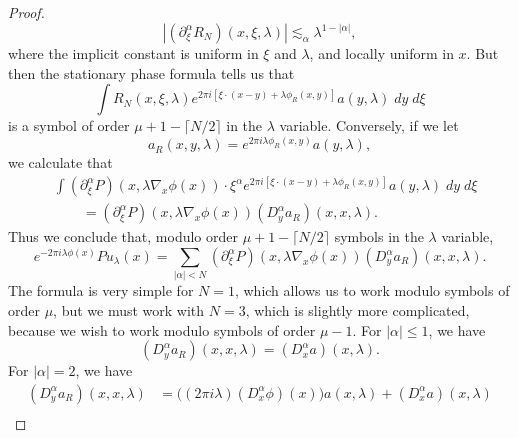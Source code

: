 \documentclass{article}
\theoremstyle{plain}
\theoremstyle{remark}
\theoremstyle{definition}
\begin{document}
\begin{proof}
	\[ |(\partial_\xi^\alpha R_N)(x,\xi,\lambda)| \lesssim_\alpha \lambda^{1 - |\alpha|}, \]
	where the implicit constant is uniform in $\xi$ and $\lambda$, and locally uniform in $x$.
	But then the stationary phase formula tells us that
	\[ \int R_N(x,\xi,\lambda) e^{2 \pi i [ \xi \cdot (x - y) + \lambda \phi_R(x,y) ]} a(y,\lambda)\; dy\; d\xi \]
	is a symbol of order $\mu + 1 - \lceil N/2 \rceil$ in the $\lambda$ variable. Conversely, if we let
	\[ a_R(x,y,\lambda) = e^{2 \pi i \lambda \phi_R(x,y)} a(y,\lambda), \]
	we calculate that
	\begin{align*}
		&\int (\partial_\xi^\alpha P)(x, \lambda \nabla_x \phi(x)) \cdot \xi^\alpha e^{2 \pi i [\xi \cdot (x - y) + \lambda \phi_R(x,y)]} a(y,\lambda)\; dy\; d\xi\\
		&\quad\quad = (\partial_\xi^\alpha P)(x, \lambda \nabla_x \phi(x)) (D_y^\alpha a_R)(x,x,\lambda).
	\end{align*}
	Thus we conclude that, modulo order $\mu + 1 - \lceil N/2 \rceil$ symbols in the $\lambda$ variable,
	\[ e^{-2 \pi i \lambda \phi(x)} Pu_\lambda(x) = \sum_{|\alpha| < N} (\partial_\xi^\alpha P)(x, \lambda \nabla_x \phi(x)) (D^\alpha_y a_R)(x,x,\lambda). \]
	The formula is very simple for $N = 1$, which allows us to work modulo symbols of order $\mu$, but we must work with $N = 3$, which is slightly more complicated, because we wish to work modulo symbols of order $\mu - 1$. For $|\alpha| \leq 1$, we have
	\[ (D^\alpha_y a_R)(x,x,\lambda) = (D^\alpha_x a)(x,\lambda). \]
	For $|\alpha| = 2$, we have
	\begin{align*}
		(D^\alpha_y a_R)(x,x,\lambda) &= \Big( (2 \pi i \lambda) (D^\alpha_x \phi)(x) \Big) a(x,\lambda) + (D^\alpha_x a)(x,\lambda)\\

\end{align*}
\end{proof}
\end{document}
